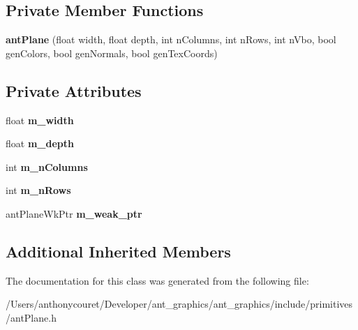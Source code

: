 \subsection*{Private Member Functions}
\begin{DoxyCompactItemize}
\item 
\hypertarget{classant_plane_a247818056d0868caa48ae8fe8be7cea8}{{\bfseries ant\+Plane} (float width, float depth, int n\+Columns, int n\+Rows, int n\+Vbo, bool gen\+Colors, bool gen\+Normals, bool gen\+Tex\+Coords)}\label{classant_plane_a247818056d0868caa48ae8fe8be7cea8}

\end{DoxyCompactItemize}
\subsection*{Private Attributes}
\begin{DoxyCompactItemize}
\item 
\hypertarget{classant_plane_a149d1bb80ff074bad37bad7fd4aa6159}{float {\bfseries m\+\_\+width}}\label{classant_plane_a149d1bb80ff074bad37bad7fd4aa6159}

\item 
\hypertarget{classant_plane_a089bbfa1fbdada0c4fde3c95f8cc2177}{float {\bfseries m\+\_\+depth}}\label{classant_plane_a089bbfa1fbdada0c4fde3c95f8cc2177}

\item 
\hypertarget{classant_plane_aa6d27a983a39724bf78d282d32736a1e}{int {\bfseries m\+\_\+n\+Columns}}\label{classant_plane_aa6d27a983a39724bf78d282d32736a1e}

\item 
\hypertarget{classant_plane_a0d3ec74b12f96ee9c19def16de3f0d12}{int {\bfseries m\+\_\+n\+Rows}}\label{classant_plane_a0d3ec74b12f96ee9c19def16de3f0d12}

\item 
\hypertarget{classant_plane_a5026e9579dde0955193ad12bfd90f554}{ant\+Plane\+Wk\+Ptr {\bfseries m\+\_\+weak\+\_\+ptr}}\label{classant_plane_a5026e9579dde0955193ad12bfd90f554}

\end{DoxyCompactItemize}
\subsection*{Additional Inherited Members}


The documentation for this class was generated from the following file\+:\begin{DoxyCompactItemize}
\item 
/\+Users/anthonycouret/\+Developer/ant\+\_\+graphics/ant\+\_\+graphics/include/primitives/ant\+Plane.\+h\end{DoxyCompactItemize}
